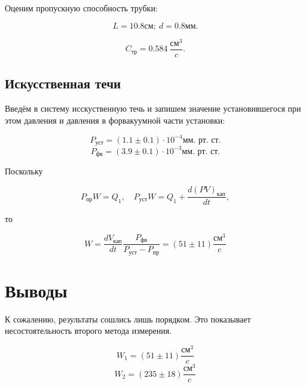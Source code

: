 \documentclass[a4paper]{article}
\begin{document}
Оценим пропускную способность трубки:

\begin{equation}
    L = 10.8 \text{см}; \ d = 0.8 \text{мм}.
\end{equation}

\begin{equation}
    C_\text{тр} = 0.584 \ \frac{\text{см$^3$}}{c}.
\end{equation}

\subsection{Искусственная течи}

Введём в систему исскуственную течь и запишем значение установившегося при этом давления и давления в форвакуумной части установки: 

\begin{equation}
     P_\text{уст} = \left( 1.1\pm 0.1 \right) \cdot 10^{-4} \text{мм. рт. ст.}
\end{equation}
\begin{equation}
     P_\text{фв} = \left( 3.9\pm 0.1 \right) \cdot 10^{-3} \text{мм. рт. ст.}
\end{equation}

Поскольку

\begin{equation}
    P_\text{пр} W = Q_1, \quad P_\text{уст} W = Q_1 + \frac{d(PV)_\text{кап}}{dt}, 
\end{equation}

то 

\begin{equation}
    W = \frac{dV_\text{кап}}{dt}\frac{P_\text{фв}}{P_\text{уст}-P_\text{пр}} = \left( 51\pm 11 \right) \frac{\text{см}^3}{c}
\end{equation}

\section{Выводы}

К сожалению, результаты сошлись лишь порядком.
Это показывает несостоятельность второго метода измерения.

\begin{equation*}
    W_1 = (51 \pm 11) \frac{\text{см}^3}{c}
\end{equation*}
\begin{equation*}
    W_2 = (235 \pm 18) \frac{\text{см}^3}{c}
\end{equation*}
\end{document}
